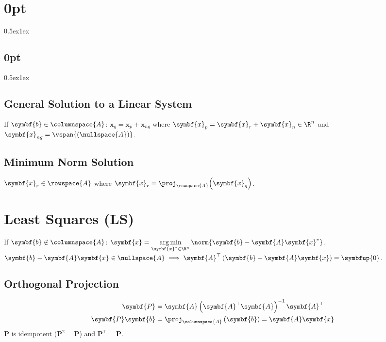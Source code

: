 \documentclass{article}
\DeclareMathOperator*{\argmin}{arg\,min}
\begin{document}
\titlespacing*\section{0pt}{0.5ex}{1ex}
\titlespacing*\subsection{0pt}{0.5ex}{1ex}
%
\setlength\abovecaptionskip{8pt}
\setlength\belowcaptionskip{-15pt}
\setlength\textfloatsep{0pt}
%
\setlength\abovedisplayskip{1pt}
\setlength\belowdisplayskip{1pt}

\begin{multicols*}{3}
    \subsection{General Solution to a Linear System}
    If \(\symbf{b} \in \columnspace{A}\): \(\symbf{x}_g = \symbf{x}_p +
    \symbf{x}_{ng}\) where \(\symbf{x}_p = \symbf{x}_r + \symbf{x}_n
    \in \R^n\) and \(\symbf{x}_{ng} =
    \vspan{\left(\nullspace{A}\right)}\).
    \subsection{Minimum Norm Solution}
    \(\symbf{x}_r \in \rowspace{A}\) where \(\symbf{x}_r = \proj_{\rowspace{A}}{\left( \symbf{x}_g \right)}\).
    \section{Least Squares (LS)}
    If \(\symbf{b} \not\in \columnspace{A}\): \(\displaystyle\symbf{x}
    = \argmin_{\symbf{x}^\ast \in \R^n} \norm{\symbf{b} -
    \symbf{A}\symbf{x}^\ast}\). \(\symbf{b} - \symbf{A} \symbf{x} \in
    \nullspace{A} \implies \symbf{A}^\top \left( \symbf{b} -
    \symbf{A}\symbf{x} \right) = \symbfup{0}\).
    \subsection{Orthogonal Projection}
    \begin{align*}
        \symbf{P}           & = \symbf{A} \left( \symbf{A}^\top \symbf{A} \right)^{-1} \symbf{A}^\top \\
        \symbf{P} \symbf{b} & = \proj_{\columnspace{A}} \left( \symbf{b} \right) = \symbf{A}\symbf{x}
    \end{align*}
    \(\symbf{P}\) is idempotent (\(\symbf{P}^2 = \symbf{P}\)) and \(\symbf{P}^\top = \symbf{P}\).

\end{multicols*}
\end{document}
